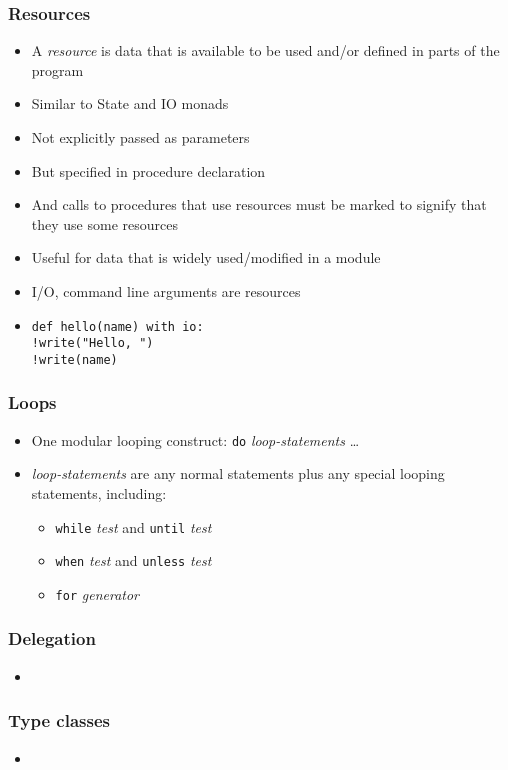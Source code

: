 \documentclass[12pt]{beamer}
\begin{document}
\begin{frame}
\frametitle{Resources}
\begin{itemize}
\item A \emph{resource} is data that is available to be used and/or
  defined in parts of the program
\item Similar to State and IO monads
\item Not explicitly passed as parameters
\item But specified in procedure declaration
\item And calls to procedures that use resources must be marked to
  signify that they use some resources
\item Useful for data that is widely used/modified in a module
\item I/O, command line arguments are resources
\item \texttt{def hello(name) with io:} \\
\hspace*{2em}\texttt{!write("Hello, ")} \\
\hspace*{2em}\texttt{!write(name)} \\
\end{itemize}
\end{frame}


\begin{frame}
\frametitle{Loops}
\begin{itemize}
\item One modular looping construct: \texttt{do} \emph{loop-statements} \ldots
\item \emph{loop-statements} are any normal statements plus any
  special looping statements, including:
  \begin{itemize}
  \item \texttt{while} \emph{test} and \texttt{until} \emph{test}
  \item \texttt{when} \emph{test} and \texttt{unless} \emph{test}
  \item \texttt{for} \emph{generator}
  \end{itemize}
\end{itemize}
\end{frame}


\begin{frame}
\frametitle{Delegation}
\begin{itemize}
\item 
\end{itemize}
\end{frame}


\begin{frame}
\frametitle{Type classes}
\begin{itemize}
\item 
\end{itemize}
\end{frame}
\end{document}
